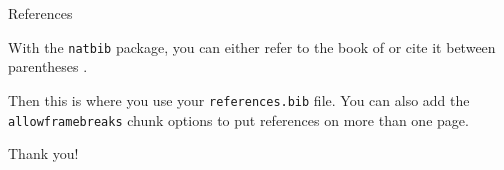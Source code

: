 \documentclass{beamer}
\begin{document}
\begin{frame}{References}

With the \texttt{natbib} package, you can either refer to the book of \citet{casella2002statistical} or cite it between parentheses \citep{rosenthal2006struck}. 

\vspace*{0.5cm}

Then this is where you use your \texttt{references.bib} file. You can also add the \texttt{allowframebreaks} chunk options to put references on more than one page. \\

\vspace*{0.5cm}

\footnotesize{
	
	
}


\end{frame}


{

\begin{frame}[plain]

\begin{center}
\textcolor{mblue}{\Large{Thank you!}}
\end{center}


\end{frame}
}
\end{document}
